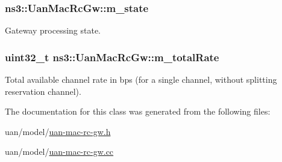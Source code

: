 \subsubsection[{\texorpdfstring{m\+\_\+state}{m_state}}]{ ns3\+::\+Uan\+Mac\+Rc\+Gw\+::m\+\_\+state\hspace{0.3cm}{\ttfamily [private]}}\hypertarget{classns3_1_1UanMacRcGw_ac3222d8eea64d77215039f67e90ef96a}{}\label{classns3_1_1UanMacRcGw_ac3222d8eea64d77215039f67e90ef96a}


Gateway processing state. 

\subsubsection[{\texorpdfstring{m\+\_\+total\+Rate}{m_totalRate}}]{\setlength{\rightskip}{0pt plus 5cm}uint32\+\_\+t ns3\+::\+Uan\+Mac\+Rc\+Gw\+::m\+\_\+total\+Rate\hspace{0.3cm}{\ttfamily [private]}}\hypertarget{classns3_1_1UanMacRcGw_aba72112136797b9263624046a7f96b4b}{}\label{classns3_1_1UanMacRcGw_aba72112136797b9263624046a7f96b4b}


Total available channel rate in bps (for a single channel, without splitting reservation channel). 



The documentation for this class was generated from the following files\+:\begin{DoxyCompactItemize}
\item 
uan/model/\hyperlink{uan-mac-rc-gw_8h}{uan-\/mac-\/rc-\/gw.\+h}\item 
uan/model/\hyperlink{uan-mac-rc-gw_8cc}{uan-\/mac-\/rc-\/gw.\+cc}\end{DoxyCompactItemize}
